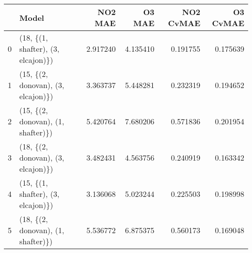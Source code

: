 \begin{tabular}{llrrrr}
\toprule
{} &                               Model &   NO2 MAE &    O3 MAE &  NO2 CvMAE &  O3 CvMAE \\
\midrule
0 &  (18, \{(1, shafter), (3, elcajon)\}) &  2.917240 &  4.135410 &   0.191755 &  0.175639 \\
1 &  (15, \{(2, donovan), (3, elcajon)\}) &  3.363737 &  5.448281 &   0.232319 &  0.194652 \\
2 &  (15, \{(2, donovan), (1, shafter)\}) &  5.420764 &  7.680206 &   0.571836 &  0.201954 \\
3 &  (18, \{(2, donovan), (3, elcajon)\}) &  3.482431 &  4.563756 &   0.240919 &  0.163342 \\
4 &  (15, \{(1, shafter), (3, elcajon)\}) &  3.136068 &  5.023244 &   0.225503 &  0.198998 \\
5 &  (18, \{(2, donovan), (1, shafter)\}) &  5.536772 &  6.875375 &   0.560173 &  0.169048 \\
\bottomrule
\end{tabular}
